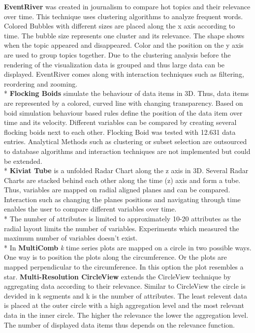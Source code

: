 \textbf{EventRiver} was created in journalism to compare hot topics and their relevance over time. This technique uses clustering algorithms to analyze frequent words. Colored Bubbles with different sizes are placed along the x axis according to time. The bubble size represents one cluster and its relevance. The shape shows when the topic appeared and disappeared. Color and the position on the y axis are used to group topics together.
Due to the clustering analysis before the rendering of the visualization data is grouped and thus large data can be displayed. 
EventRiver comes along with interaction techniques such as filtering, reordering and zooming.
\\*
\textbf{Flocking Boids} simulate the behaviour of data items in 3D. Thus, data items are represented by a colored, curved line with changing transparency. Based on boid simulation behaviour based rules define the position of the data item over time and its velocity. Different variables can be compared by creating several flocking boids next to each other. Flocking Boid was tested with 12.631 data entries\cite{Moere2004}. 
Analytical Methods such as clustering or subset selection are outsourced to database algorithms and interaction techniques are not implemented but could be extended\cite{Moere2004}.
\\*
\textbf{Kiviat Tube} is a unfolded Radar Chart along the z axis in 3D. Several Radar Charts are stacked behind each other along the time (z) axis and form a tube. Thus, variables are mapped on radial aligned planes and can be compared. Interaction such as changing the planes positions and navigating through time enables the user to compare different variables over time.\\*
The number of attributes is limited to approximately 10-20 attributes as the radial layout limits the number of variables. Experiments which measured the maximum number of variables doesn't exist. 
\\*
In \textbf{MultiComb} \textit{k} time series plots are mapped on a circle in two possible ways. One way is to position the plots along the circumference. Or the plots are mapped perpendicular to the circumference. In this option the plot resembles a star.  
\textbf{Multi-Resolution CircleView} extends the CircleView technique by aggregating data according to their relevance. Similar to CircleView the circle is devided in k segments and k is the number of attributes. The least relevent data is placed at the outer circle with a high aggregation level and the most relevant data in the inner circle. The higher the relevance the lower the aggregation level. The number of displayed data items thus depends on the relevance function. 
